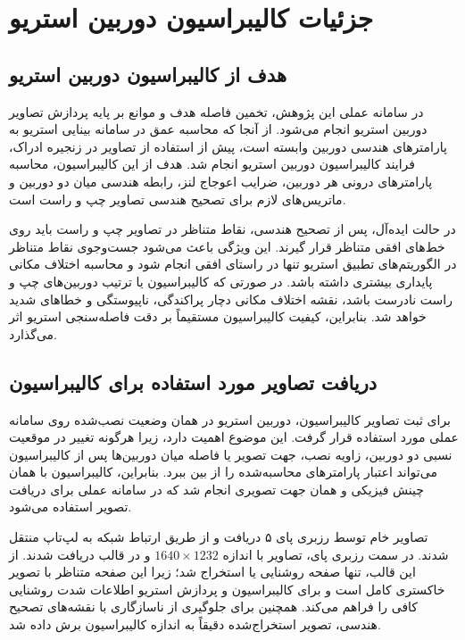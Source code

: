 \chapter{جزئیات کالیبراسیون دوربین استریو}
\label{app:stereo_calibration_details}

\section{هدف از کالیبراسیون دوربین استریو}
\label{app:stereo_calibration_objective}

در سامانه عملی این پژوهش، تخمین فاصله هدف و موانع بر پایه پردازش تصاویر دوربین استریو انجام می‌شود. از آنجا که محاسبه عمق در سامانه بینایی استریو به پارامترهای هندسی دوربین وابسته است، پیش از استفاده از تصاویر در زنجیره ادراک، فرایند کالیبراسیون دوربین استریو انجام شد. هدف از این کالیبراسیون، محاسبه پارامترهای درونی هر دوربین، ضرایب اعوجاج لنز، رابطه هندسی میان دو دوربین و ماتریس‌های لازم برای تصحیح هندسی تصاویر چپ و راست است.

در حالت ایده‌آل، پس از تصحیح هندسی، نقاط متناظر در تصاویر چپ و راست باید روی خط‌های افقی متناظر قرار گیرند. این ویژگی باعث می‌شود جست‌وجوی نقاط متناظر در الگوریتم‌های تطبیق استریو تنها در راستای افقی انجام شود و محاسبه اختلاف مکانی پایداری بیشتری داشته باشد. در صورتی که کالیبراسیون یا ترتیب دوربین‌های چپ و راست نادرست باشد، نقشه اختلاف مکانی دچار پراکندگی، ناپیوستگی و خطاهای شدید خواهد شد. بنابراین، کیفیت کالیبراسیون مستقیماً بر دقت فاصله‌سنجی استریو اثر می‌گذارد.

\section{دریافت تصاویر مورد استفاده برای کالیبراسیون}
\label{app:stereo_calibration_image_capture}

برای ثبت تصاویر کالیبراسیون، دوربین استریو  در همان وضعیت نصب‌شده روی سامانه عملی مورد استفاده قرار گرفت. این موضوع اهمیت دارد، زیرا هرگونه تغییر در موقعیت نسبی دو دوربین، زاویه نصب، جهت تصویر یا فاصله میان دوربین‌ها پس از کالیبراسیون می‌تواند اعتبار پارامترهای محاسبه‌شده را از بین ببرد. بنابراین، کالیبراسیون با همان چینش فیزیکی و همان جهت تصویری انجام شد که در سامانه عملی برای دریافت تصویر استفاده می‌شود.

تصاویر خام توسط رزبری پای ۵ دریافت و از طریق ارتباط شبکه به لپ‌تاپ منتقل شدند. در سمت رزبری پای، تصاویر با اندازه $1640 \times 1232$ و در قالب  دریافت شدند. از این قالب، تنها صفحه روشنایی یا  استخراج شد؛ زیرا این صفحه متناظر با تصویر خاکستری کامل است و برای کالیبراسیون و پردازش استریو اطلاعات شدت روشنایی کافی را فراهم می‌کند. همچنین برای جلوگیری از ناسازگاری با نقشه‌های تصحیح هندسی، تصویر استخراج‌شده دقیقاً به اندازه کالیبراسیون برش داده شد.

